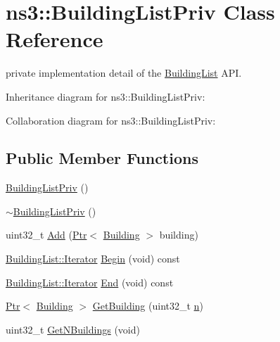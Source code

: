 \hypertarget{classns3_1_1BuildingListPriv}{}\section{ns3\+:\+:Building\+List\+Priv Class Reference}
\label{classns3_1_1BuildingListPriv}


private implementation detail of the \hyperlink{classns3_1_1BuildingList}{Building\+List} A\+PI.  




Inheritance diagram for ns3\+:\+:Building\+List\+Priv\+:


Collaboration diagram for ns3\+:\+:Building\+List\+Priv\+:
\subsection*{Public Member Functions}
\begin{DoxyCompactItemize}
\item 
\hyperlink{classns3_1_1BuildingListPriv_a2e001fea0991f6cdacf04e3aa76f8323}{Building\+List\+Priv} ()
\item 
\hyperlink{classns3_1_1BuildingListPriv_a2c2c81c1d1776e668f8b9c67b0ac1075}{$\sim$\+Building\+List\+Priv} ()
\item 
uint32\+\_\+t \hyperlink{classns3_1_1BuildingListPriv_a7757d293719309ce99908b24b0f42756}{Add} (\hyperlink{classns3_1_1Ptr}{Ptr}$<$ \hyperlink{classns3_1_1Building}{Building} $>$ building)
\item 
\hyperlink{classns3_1_1BuildingList_a84957ecea4b4343f676da0e96f2c8130}{Building\+List\+::\+Iterator} \hyperlink{classns3_1_1BuildingListPriv_accc6d2c54b71309e88b3411166a9d0b1}{Begin} (void) const 
\item 
\hyperlink{classns3_1_1BuildingList_a84957ecea4b4343f676da0e96f2c8130}{Building\+List\+::\+Iterator} \hyperlink{classns3_1_1BuildingListPriv_ac2a7257595c4220a4b9fb8af801cd41c}{End} (void) const 
\item 
\hyperlink{classns3_1_1Ptr}{Ptr}$<$ \hyperlink{classns3_1_1Building}{Building} $>$ \hyperlink{classns3_1_1BuildingListPriv_a1386b6059dc58301b1026f352367b952}{Get\+Building} (uint32\+\_\+t \hyperlink{lte__link__budget__x2__handover__measures_8m_abdb05bc5a064cf642a06c83b3392f148}{n})
\item 
uint32\+\_\+t \hyperlink{classns3_1_1BuildingListPriv_aaeade049507adbefa3909599e08926da}{Get\+N\+Buildings} (void)
\end{DoxyCompactItemize}
